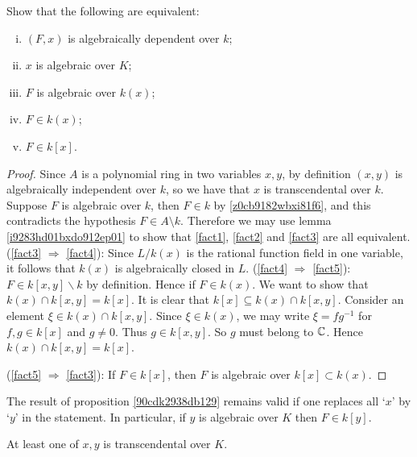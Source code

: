 \begin{proposition} \label {90cdk2938db129}
Show that the following are equivalent:
\begin{enumerate}[(i)]
\item \label{fact1} $(F,x)$ is algebraically dependent over $ k$;
\item \label{fact2} $x$ is algebraic over $K$;
\item \label{fact3} $F$ is algebraic over $ k(x)$;
\item \label{fact4} $F \in  k(x)$;
\item \label{fact5} $F \in  k[x]$.
\end{enumerate}
\end{proposition}

\begin{proof}
Since $A$ is a polynomial ring in two variables $x,y$, by definition $(x,y)$ 
is algebraically independent over $ k$, so we have that $x$ is transcendental 
over $ k$. Suppose $F$ is algebraic over $ k$, 
then $F \in  k$ by \ref{z0cb9182wbxi81f6}, 
and this contradicts the hypothesis $F \in A \setminus k$.
Therefore we may use lemma \ref{i9283hd01bxdo912ep01} 
to show that \ref{fact1}, \ref{fact2} and \ref{fact3} are all equivalent.
(\eqref{fact3} $\Rightarrow $ \eqref{fact4}): 
Since $L/ k(x)$ is the rational function field 
in one variable, it follows that $ k(x)$ is algebraically closed
in $L$.
(\eqref{fact4} $\Rightarrow $ \eqref{fact5}): 
$ F \in  k[x,y] \backslash  k$ by definition. 
Hence if $F\in  k(x) $. We want to show that 
$ k(x) \cap  k[x,y] =  k[x]$. 
It is clear that $ k[x] \subseteq k(x) \cap  k[x,y]$.
Consider an element $\xi \in  k(x) \cap  k[x,y]$.
Since $\xi \in  k(x)$, we may write $\xi = fg^{-1}$ for
$f,g\in  k[x]$ and $g \neq 0$. Thus $g \in  k[x,y]$. 
So $g$ must belong to $\mathbb{C}$. Hence $ k(x) \cap  k[x,y] =  k[x]$.



(\eqref{fact5} $\Rightarrow $ \eqref{fact3}):
If $F \in  k[x]$, then $F$ is algebraic over $ k[x] \subset  k(x)$.
\end{proof}


\begin{remark}
The result of proposition \ref{90cdk2938db129} remains valid 
if one replaces all `$x$' by `$y$' in the statement.
In particular, if $y$ is algebraic over $K$ then $F \in  k[y]$.
\end{remark}

\begin{corollary} \label {9fo13d912o9o0}
At least one of $x,y$ is transcendental over $K$.
\end{corollary}

